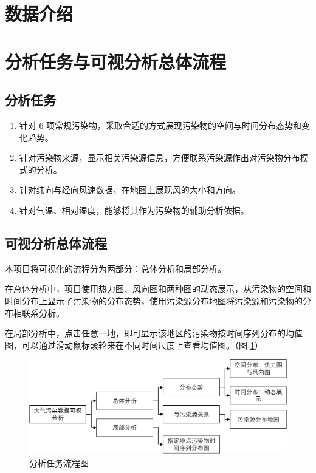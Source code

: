 \documentclass[UTF8]{ctexrep}
\begin{document}
    \section{数据介绍}

    \section{分析任务与可视分析总体流程}
    
    \subsection{分析任务}
    \begin{enumerate}
    	\item 针对 6 项常规污染物，采取合适的方式展现污染物的空间与时间分布态势和变化趋势。
    	\item 针对污染物来源，显示相关污染源信息，方便联系污染源作出对污染物分布模式的分析。
    	\item 针对纬向与经向风速数据，在地图上展现风的大小和方向。
    	\item 针对气温、相对湿度，能够将其作为污染物的辅助分析依据。
    \end{enumerate}

	\subsection{可视分析总体流程}
    本项目将可视化的流程分为两部分：总体分析和局部分析。
    \par
    在总体分析中，项目使用热力图、风向图和两种图的动态展示，从污染物的空间和时间分布上显示了污染物的分布态势，使用污染源分布地图将污染源和污染物的分布相联系分析。
    \par
    在局部分析中，点击任意一地，即可显示该地区的污染物按时间序列分布的均值图，可以通过滑动鼠标滚轮来在不同时间尺度上查看均值图。（图 \ref{fig:analyze_task}）
	
	\begin{figure}[h!]
        \centering
        \includegraphics[width=14cm,keepaspectratio]{images/analyze_task.png}
        \caption{分析任务流程图}
        \label{fig:analyze_task}
   	\end{figure}
    	
\end{document}
